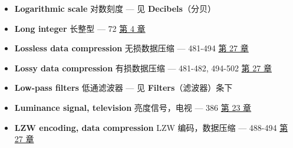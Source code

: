 \begin{itemize}
  \begin{itemize}
  \tightlist
  \item
    alternatives：替代方案 --- 104-106  \hyperref[ch-05]{第 5
    章}
  \item
    commutative property：交换律 --- 96  \hyperref[ch-05]{第 5
    章}
  \item
    decomposition：分解 --- 见 \textbf{Decomposition}（分解）
  \item
    examples of linear and nonlinear systems：线性与非线性系统的例子 ---
    94-95  \hyperref[ch-05]{第 5 章}
  \item
    Fourier transform, of the：傅里叶变换的线性 --- 185-188 
    \hyperref[ch-10]{第 10 章}
  \item
    memoryless systems：无记忆系统 --- 93  \hyperref[ch-05]{第
    5 章}
  \item
    multiplication：乘法 --- 97  \hyperref[ch-05]{第 5 章}
  \item
    noise, adding：加入噪声 --- 97  \hyperref[ch-05]{第 5 章}
  \item
    requirements for：所需条件 --- 89  \hyperref[ch-05]{第 5
    章}
  \item
    sinusoidal fidelity：正弦保真性 --- 92-94 
    \hyperref[ch-05]{第 5 章}；142  \hyperref[ch-08]{第 8 章}
  \item
    static linearity：静态线性 --- 92-93  \hyperref[ch-05]{第
    5 章}
  \item
    superposition：叠加 --- 98-100  \hyperref[ch-05]{第 5 章}
  \item
    synthesis：合成 --- 98-99  \hyperref[ch-05]{第 5 章}
  \end{itemize}
\item
  \textbf{Logarithmic scale} 对数刻度 --- 见 \textbf{Decibels}（分贝）
\item
  \textbf{Long integer} 长整型 --- 72  \hyperref[ch-04]{第 4
  章}
\item
  \textbf{Lossless data compression} 无损数据压缩 --- 481-494 
  \hyperref[ch-27]{第 27 章}
\item
  \textbf{Lossy data compression} 有损数据压缩 --- 481-482, 494-502
   \hyperref[ch-27]{第 27 章}
\item
  \textbf{Low-pass filters} 低通滤波器 --- 见
  \textbf{Filters}（滤波器）条下
\item
  \textbf{Luminance signal, television} 亮度信号，电视 --- 386
   \hyperref[ch-23]{第 23 章}
\item
  \textbf{LZW encoding, data compression} LZW 编码，数据压缩 --- 488-494
   \hyperref[ch-27]{第 27 章}
\end{itemize}

